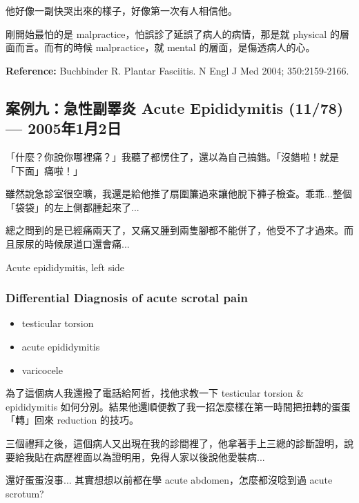 \documentclass[12pt,a4paper]{article}
\newenvironment{myquote}{%
    \begin{tcolorbox}[
        colback=quote_bg,
        colframe=emergency_gray,
        boxrule=0pt,
        leftrule=3pt,
        arc=0pt,
        left=10pt,
        right=10pt,
        top=8pt,
        bottom=8pt
    ]
    \itshape
}{%
    \end{tcolorbox}
}
\begin{document}
他好像一副快哭出來的樣子，好像第一次有人相信他。

\begin{myquote}
剛開始最怕的是 malpractice，怕誤診了延誤了病人的病情，那是就 physical 的層面而言。而有的時候 malpractice，就 mental 的層面，是傷透病人的心。
\end{myquote}

\textbf{Reference:} Buchbinder R. Plantar Fasciitis. N Engl J Med 2004; 350:2159-2166.

\subsection{案例九：急性副睪炎 Acute Epididymitis (11/78) — 2005年1月2日}

「什麼？你說你哪裡痛？」我聽了都愣住了，還以為自己搞錯。「沒錯啦！就是「下面」痛啦！」

雖然說急診室很空曠，我還是給他推了扇圍簾過來讓他脫下褲子檢查。乖乖...整個「袋袋」的左上側都腫起來了...

總之問到的是已經痛兩天了，又痛又腫到兩隻腳都不能併了，他受不了才過來。而且尿尿的時候尿道口還會痛...

\begin{tcolorbox}[
    colback=emergency_blue!10!white,
    colframe=emergency_blue,
    title=\textbf{Impression},
    fonttitle=\bfseries
]
Acute epididymitis, left side
\end{tcolorbox}

\subsubsection{Differential Diagnosis of acute scrotal pain}

\begin{itemize}
    \item testicular torsion
    \item acute epididymitis
    \item varicocele
\end{itemize}

為了這個病人我還撥了電話給阿哲，找他求教一下 testicular torsion \& epididymitis 如何分別。結果他還順便教了我一招怎麼樣在第一時間把扭轉的蛋蛋「轉」回來 reduction 的技巧。

三個禮拜之後，這個病人又出現在我的診間裡了，他拿著手上三總的診斷證明，說要給我貼在病歷裡面以為證明用，免得人家以後說他愛裝病...

\begin{myquote}
還好蛋蛋沒事... 其實想想以前都在學 acute abdomen，怎麼都沒唸到過 acute scrotum?
\end{myquote}
\end{document}
